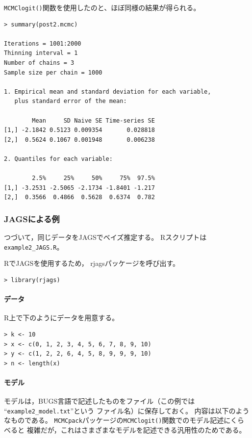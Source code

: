 \documentclass[11pt,uplatex]{jsarticle}
\begin{document}
\texttt{MCMClogit()}関数を使用したのと、ほぼ同様の結果が得られる。

\begin{lstlisting}
> summary(post2.mcmc)

Iterations = 1001:2000
Thinning interval = 1 
Number of chains = 3 
Sample size per chain = 1000 

1. Empirical mean and standard deviation for each variable,
   plus standard error of the mean:

        Mean     SD Naive SE Time-series SE
[1,] -2.1842 0.5123 0.009354       0.028818
[2,]  0.5624 0.1067 0.001948       0.006238

2. Quantiles for each variable:

        2.5%     25%     50%     75%  97.5%
[1,] -3.2531 -2.5065 -2.1734 -1.8401 -1.217
[2,]  0.3566  0.4866  0.5628  0.6374  0.782
\end{lstlisting}


\subsubsection{JAGSによる例}

つづいて，同じデータを\textsf{JAGS}でベイズ推定する。
\textsf{R}スクリプトは\texttt{example2\_JAGS.R}。


\textsf{R}で\textsf{JAGS}を使用するため，
\textsf{rjags}パッケージを呼び出す。
\begin{lstlisting}
> library(rjags)
\end{lstlisting}

\paragraph{データ}
\textsf{R}上で下のようにデータを用意する。
\begin{lstlisting}
> k <- 10
> x <- c(0, 1, 2, 3, 4, 5, 6, 7, 8, 9, 10)
> y <- c(1, 2, 2, 6, 4, 5, 8, 9, 9, 9, 10)
> n <- length(x)
\end{lstlisting}


\paragraph{モデル}
モデルは，BUGS言語で記述したものをファイル（この例では
``\texttt{example2\_model.txt}''という
ファイル名）に保存しておく。
内容は以下のようなものである。
\texttt{MCMCpack}パッケージの\texttt{MCMClogit()}関数でのモデル記述にくらべると
複雑だが，これはさまざまなモデルを記述できる汎用性のためである。
\end{document}

